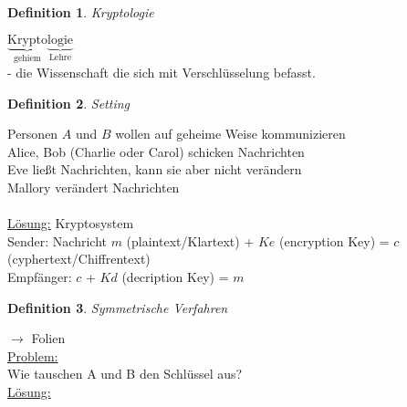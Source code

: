 \documentclass[a4paper,11pt]{article}
\newtheorem{definition}{Definition}[section]
\begin{document}
\begin{definition}
	Kryptologie
\end{definition}
$\underbrace{\text{Krypto}}_{\text{gehiem}}\underbrace{\text{logie}}_{\text{Lehre}}$ \\
- die Wissenschaft die sich mit Verschlüsselung befasst.

\begin{definition}
	Setting
\end{definition}
Personen $A$ und $B$ wollen auf geheime Weise kommunizieren \\
Alice, Bob (Charlie oder Carol) schicken Nachrichten \\
Eve ließt Nachrichten, kann sie aber nicht verändern \\
Mallory verändert Nachrichten \\
\\
\underline{Lösung:} Kryptosystem \\
Sender: Nachricht $m$ (plaintext/Klartext) + $Ke$ (encryption Key) = $c$ (cyphertext/Chiffrentext) \\
Empfänger: $c$ + $Kd$ (decription Key) = $m$ \\

\begin{definition}
	Symmetrische Verfahren
\end{definition}
$\rightarrow$ Folien \\

\underline{Problem:} \\
Wie tauschen A und B den Schlüssel aus? \\
\underline{Lösung:} \\
\end{document}
